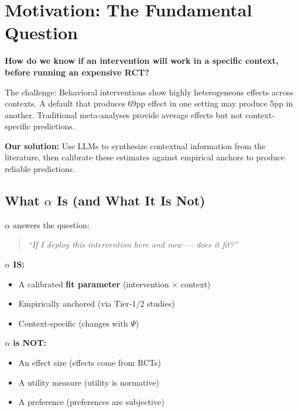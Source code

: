 
\section{Motivation: The Fundamental Question}
\label{sec:iii-motivation}

\begin{tcolorbox}[colback=yellow!5!white, colframe=orange!75!black,
    title=The Central Question]
\textbf{How do we know if an intervention will work in a specific context,
before running an expensive RCT?}
\end{tcolorbox}

The challenge: Behavioral interventions show highly heterogeneous effects across contexts.
A default that produces 69pp effect in one setting may produce 5pp in another.
Traditional meta-analyses provide average effects but not context-specific predictions.

\textbf{Our solution:} Use LLMs to synthesize contextual information from the literature,
then calibrate these estimates against empirical anchors to produce reliable predictions.

\subsection{What $\alpha$ Is (and What It Is Not)}
\label{sec:iii-alpha-definition}

\begin{tcolorbox}[colback=green!5!white, colframe=green!75!black,
    title=The $\alpha$-Parameter: A Fit Measure]

$\alpha$ answers the question:
\begin{quote}
\emph{``If I deploy this intervention here and now --- does it fit?''}
\end{quote}

\textbf{$\alpha$ IS:}
\begin{itemize}[nosep]
\item A calibrated \textbf{fit parameter} (intervention $\times$ context)
\item Empirically anchored (via Tier-1/2 studies)
\item Context-specific (changes with $\Psi$)
\end{itemize}

\textbf{$\alpha$ is NOT:}
\begin{itemize}[nosep]
\item An effect size (effects come from RCTs)
\item A utility measure (utility is normative)
\item A preference (preferences are subjective)
\end{itemize}

\end{tcolorbox}

